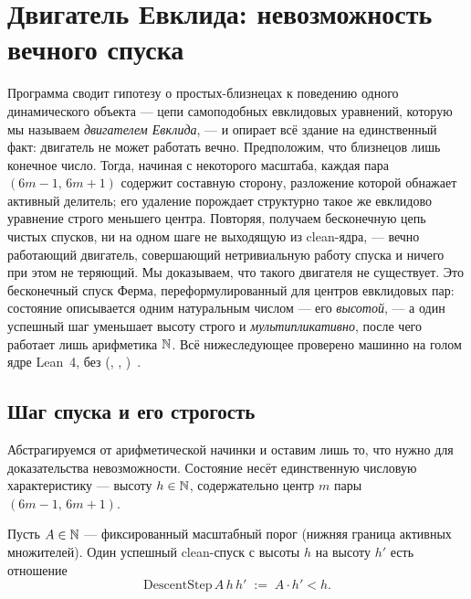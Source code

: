 \section{Двигатель Евклида: невозможность вечного спуска}\label{sec:engine}

Программа сводит гипотезу о простых-близнецах к поведению одного динамического объекта --- цепи
самоподобных евклидовых уравнений, которую мы называем \emph{двигателем Евклида}, --- и опирает всё
здание на единственный факт: двигатель не может работать вечно. Предположим, что близнецов лишь
конечное число. Тогда, начиная с некоторого масштаба, каждая пара $(6m-1,\,6m+1)$ содержит составную
сторону, разложение которой обнажает активный делитель; его удаление порождает структурно такое же
евклидово уравнение строго меньшего центра. Повторяя, получаем бесконечную цепь чистых спусков, ни
на одном шаге не выходящую из clean-ядра, --- вечно работающий двигатель, совершающий нетривиальную
работу спуска и ничего при этом не теряющий. Мы доказываем, что такого двигателя не существует. Это
бесконечный спуск Ферма, переформулированный для центров евклидовых пар: состояние описывается одним
натуральным числом --- его \emph{высотой}, --- а один успешный шаг уменьшает высоту строго и
\emph{мультипликативно}, после чего работает лишь арифметика $\mathbb{N}$. Всё нижеследующее проверено машинно
на голом ядре Lean~4, без  (,
, )~\cite{lean4,euclidspath-repo}.

\subsection{Шаг спуска и его строгость}

Абстрагируемся от арифметической начинки и оставим лишь то, что нужно для доказательства
невозможности. Состояние несёт единственную числовую характеристику --- высоту $h\in\mathbb{N}$,
содержательно центр $m$ пары $(6m-1,\,6m+1)$.

\begin{definition}\label{thm:DescentStep}
Пусть $A\in\mathbb{N}$ --- фиксированный масштабный порог (нижняя граница активных множителей). Один успешный
clean-спуск с высоты $h$ на высоту $h'$ есть отношение
\begin{equation}\label{eq:descentstep}
  \mathrm{DescentStep}\,A\,h\,h' \;:=\; A\cdot h' < h.
\end{equation}
\end{definition}


